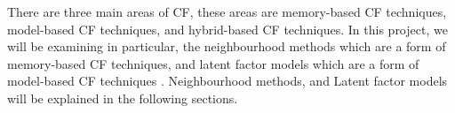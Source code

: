 


There are three main areas of CF, these areas are memory-based CF techniques, model-based CF techniques, and hybrid-based CF techniques. In this project, we will be examining in particular, the neighbourhood methods which are a form of memory-based CF techniques, and latent factor models which are a form of model-based CF techniques \cite{survey, koren2009matrix}. Neighbourhood methods, and Latent factor models will be explained in the following sections. 


